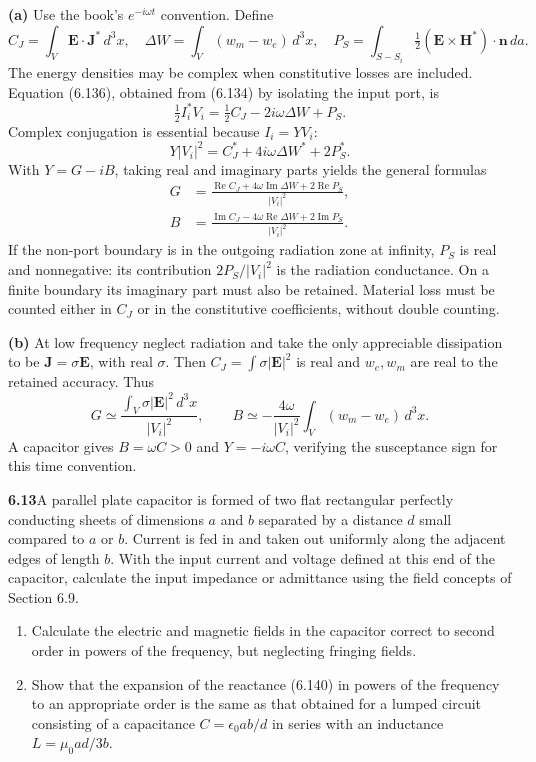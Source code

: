 \textbf{(a)} Use the book's $e^{-i\omega t}$ convention. Define
\[
C_J=\int_V\mathbf E\cdot\mathbf J^*\,d^3x,\quad
\Delta W=\int_V(w_m-w_e)\,d^3x,\quad
P_S=\int_{S-S_i}\tfrac12(\mathbf E\times\mathbf H^*)\cdot\mathbf n\,da.
\]
The energy densities may be complex when constitutive losses are included.
Equation (6.136), obtained from (6.134) by isolating the input port, is
\[
\tfrac12I_i^*V_i=\tfrac12C_J-2i\omega\Delta W+P_S.
\]
Complex conjugation is essential because $I_i=YV_i$:
\[
Y|V_i|^2=C_J^*+4i\omega\Delta W^*+2P_S^*.
\]
With $Y=G-iB$, taking real and imaginary parts yields the general formulas
\begin{align*}
\boxed{G}&=\boxed{\frac{\operatorname{Re}C_J+4\omega\operatorname{Im}\Delta W
+2\operatorname{Re}P_S}{|V_i|^2}},\\
\boxed{B}&=\boxed{\frac{\operatorname{Im}C_J-4\omega\operatorname{Re}\Delta W
+2\operatorname{Im}P_S}{|V_i|^2}}.
\end{align*}
If the non-port boundary is in the outgoing radiation zone at infinity,
$P_S$ is real and nonnegative: its contribution $2P_S/|V_i|^2$ is the
radiation conductance. On a finite boundary its imaginary part must also
be retained. Material loss must be counted either in $C_J$ or in the
constitutive coefficients, without double counting.

\textbf{(b)} At low frequency neglect radiation and take the only
appreciable dissipation to be $\mathbf J=\sigma\mathbf E$, with real
$\sigma$. Then $C_J=\int\sigma|\mathbf E|^2$ is real and $w_e,w_m$ are
real to the retained accuracy. Thus
\[
\boxed{G\simeq\frac{\int_V\sigma|\mathbf E|^2\,d^3x}{|V_i|^2},\qquad
B\simeq-\frac{4\omega}{|V_i|^2}\int_V(w_m-w_e)\,d^3x.}
\]
A capacitor gives $B=\omega C>0$ and $Y=-i\omega C$, verifying the
susceptance sign for this time convention.

\par\bigskip
\noindent\textbf{6.13}\quad A parallel plate capacitor is formed of two flat rectangular perfectly conducting sheets of dimensions $a$ and $b$ separated by a distance $d$ small compared to $a$ or $b$. Current is fed in and taken out uniformly along the adjacent edges of length $b$. With the input current and voltage defined at this end of the capacitor, calculate the input impedance or admittance using the field concepts of Section 6.9.
\begin{enumerate}
\item[(a)] Calculate the electric and magnetic fields in the capacitor correct to second order in powers of the frequency, but neglecting fringing fields.
\item[(b)] Show that the expansion of the reactance (6.140) in powers of the frequency to an appropriate order is the same as that obtained for a lumped circuit consisting of a capacitance $C=\epsilon_{0}ab/d$ in series with an inductance $L=\mu_{0}ad/3b$.
\end{enumerate}
\solution

